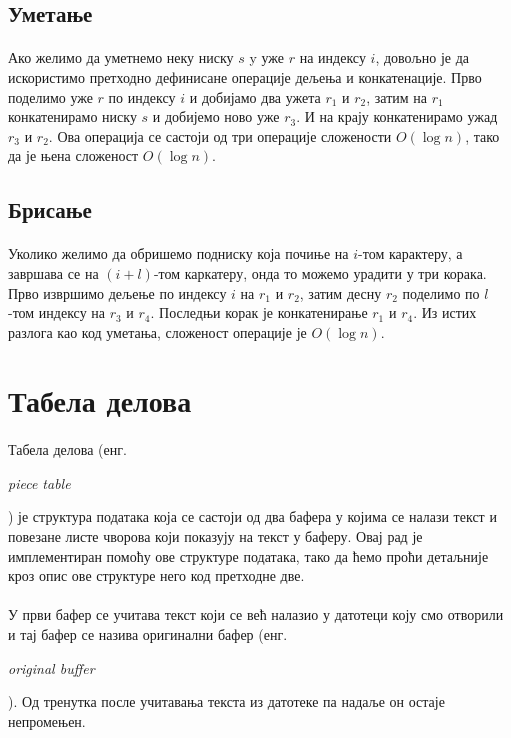 \documentclass[12pt,oneside]{memoir}
\begin{document}
\subsection{Уметање}
\paragraph{}
Ако желимо да уметнемо неку ниску \(s\) y уже \(r\) на индексу \(i\), довољно је да искористимо претходно дефинисане операције дељења и конкатенације. Прво поделимо уже \(r\) по индексу \(i\)
и добијамо два ужета \(r_1\) и \(r_2\), затим на \(r_1\) конкатенирамо ниску \(s\) и добијемо
ново уже \(r_3\). И на крају конкатенирамо ужад \(r_3\) и \(r_2\). Ова операција се састоји
од три операције сложености \(O(\log{}n)\), тако да је њена сложеност \(O(\log{}n)\).

\subsection{Брисање}
\paragraph{}
Уколико желимо да обришемо подниску која почиње на \(i\)-том карактеру, а завршава се на
\((i+l)\)-том каркатеру, онда то можемо урадити у три корака. Прво извршимо дељење по индексу 
\(i\) на \(r_1\) и \(r_2\), затим десну \(r_2\) поделимо по \(l\)-том индексу на \(r_3\)
и \(r_4\). Последњи корак је конкатенирање \(r_1\) и \(r_4\). Из истих разлога као код
уметања, сложеност операције је \(O(\log{}n)\).

\section{Табела делова}
\paragraph{}
Табела делова (енг. \begin{latinica}\textit{piece table}\end{latinica}) је структура података
која се састоји од два бафера у којима се налази текст и повезане листе чворова који показују
на текст у баферу. Овај рад је имплементиран помоћу ове структуре података, тако да ћемо проћи
детаљније кроз опис ове структуре него код претходне две.

\paragraph{}
У први бафер се учитава текст који се већ налазио у датотеци коју смо
отворили и тај бафер се назива оригинални бафер (енг. \begin{latinica}\textit{original buffer}\end{latinica}). Од тренутка после учитавања текста из датотеке па надаље он остаје непромењен. 
\end{document}
